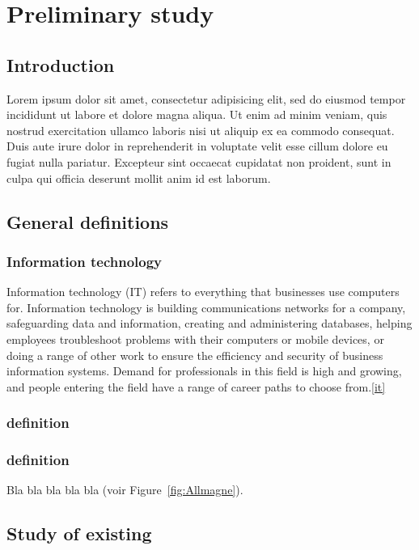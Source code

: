 \chapter{Preliminary study}

\section{Introduction}
Lorem ipsum dolor sit amet, consectetur adipisicing elit, sed do eiusmod
tempor incididunt ut labore et dolore magna aliqua. Ut enim ad minim veniam,
quis nostrud exercitation ullamco laboris nisi ut aliquip ex ea commodo
consequat. Duis aute irure dolor in reprehenderit in voluptate velit esse
cillum dolore eu fugiat nulla pariatur. Excepteur sint occaecat cupidatat non
proident, sunt in culpa qui officia deserunt mollit anim id est laborum.

\section{General definitions}
\subsection{Information technology}
Information technology (IT) refers to everything that businesses use computers for. 
Information technology is building communications networks for a company, 
safeguarding data and information, creating and administering databases, helping 
employees troubleshoot problems with their computers or mobile devices, or doing a 
range of other work to ensure the efficiency and security of business information 
systems. Demand for professionals in this field is high and growing, and people 
entering the field have a range of career paths to choose from.\ref{it}

\subsection{definition}
\subsection{definition}
Bla bla bla bla bla (voir Figure~\ref{fig:Allmagne}).

\section{Study of existing}
